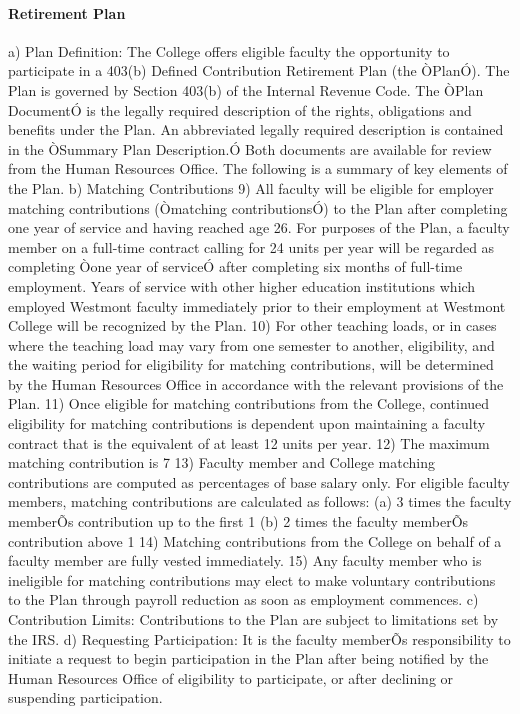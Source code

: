 \documentclass[letterpaper, 11pt]{article}
\begin{document}
			\paragraph{Retirement Plan}
				a) Plan Definition:  The College offers eligible faculty the opportunity to participate in a 403(b) Defined Contribution Retirement Plan (the ÒPlanÓ).  The Plan is governed by Section 403(b) of the Internal Revenue Code.  The ÒPlan DocumentÓ is the legally required description of the rights, obligations and benefits under the Plan.  An abbreviated legally required description is contained in the ÒSummary Plan Description.Ó  Both documents are available for review from the Human Resources Office.  The following is a summary of key elements of the Plan.
				b) Matching Contributions
				9) All faculty will be eligible for employer matching contributions (Òmatching contributionsÓ) to the Plan after completing one year of service and having reached age 26.  For purposes of the Plan, a faculty member on a full-time contract calling for 24 units per year will be regarded as completing Òone year of serviceÓ after completing six months of full-time employment.  Years of service with other higher education institutions which employed Westmont faculty immediately prior to their employment at Westmont College will be recognized by the Plan.
				10) For other teaching loads, or in cases where the teaching load may vary from one semester to another, eligibility, and the waiting period for eligibility for matching contributions, will be determined by the Human Resources Office in accordance with the relevant provisions of the Plan.
				11) Once eligible for matching contributions from the College, continued eligibility for matching contributions is dependent upon maintaining a faculty contract that is the equivalent of at least 12 units per year.
				12) The maximum matching contribution is 7%
				13) Faculty member and College matching contributions are computed as percentages of base salary only.  For eligible faculty members, matching contributions are calculated as follows:
				(a) 3 times the faculty memberÕs contribution up to the first 1%
				(b) 2 times the faculty memberÕs contribution above 1%
				14) Matching contributions from the College on behalf of a faculty member are fully vested immediately.
				15) Any faculty member who is ineligible for matching contributions may elect to make voluntary contributions to the Plan through payroll reduction as soon as employment commences.
				c) Contribution Limits:  Contributions to the Plan are subject to limitations set by the IRS.
				d) Requesting Participation:  It is the faculty memberÕs responsibility to initiate a request to begin participation in the Plan after being notified by the Human Resources Office of eligibility to participate, or after declining or suspending participation.
\end{document}
